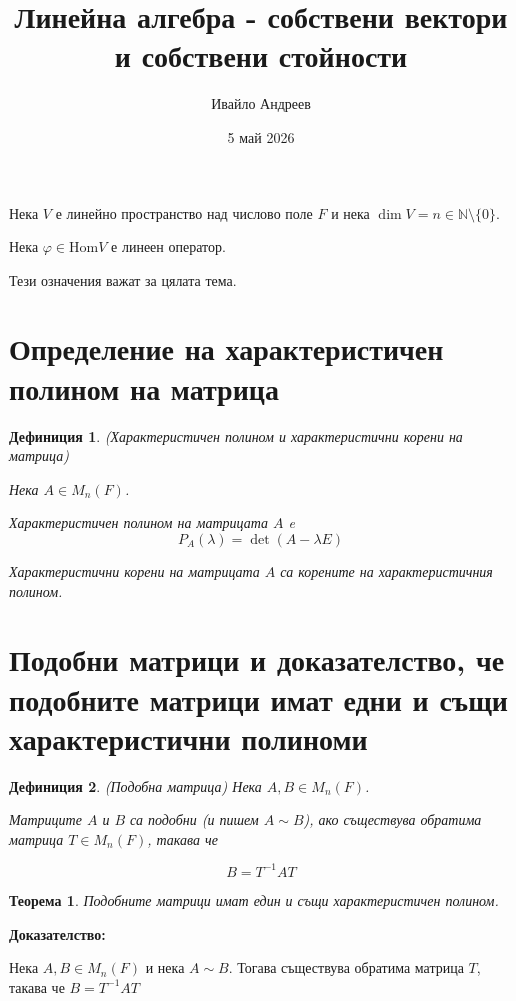 \documentclass{scrartcl}
\title{Линейна алгебра - собствени вектори и собствени стойности}
\author{Ивайло Андреев}
\date{5 май 2026}
\newtheorem{theorem}{Теорема}
\newtheorem{definition}{Дефиниция}
\begin{document}
\maketitle

\tableofcontents

\newpage

\begin{FlushLeft}

Нека $V$ е линейно пространство над числово поле $F$ и нека $\dim{V} = n \in \mathbb{N} \setminus \lbrace 0 \rbrace$.

Нека $\varphi \in \text{Hom}{V}$ е линеен оператор.

Тези означения важат за цялата тема.

\section{Определение на характеристичен полином на матрица}

\begin{definition}
(Характеристичен полином и характеристични корени на матрица)

Нека $A \in M_n(F)$.

Характеристичен полином на матрицата $A$ e
\[
P_A(\lambda) = \det(A - \lambda E)
\]

Характеристични корени на матрицата $A$ са корените на характеристичния полином.
\end{definition}

\section{Подобни матрици и
доказателство, че подобните матрици имат едни и същи характеристични полиноми}

\begin{definition}
(Подобна матрица)
Нека $A, B \in M_n(F)$.

Матриците $A$ и $B$ са подобни (и пишем $A \sim B$), ако съществува обратима матрица $T \in M_n(F)$, такава че

$$B = T^{-1}AT$$
\end{definition}

\begin{theorem}
Подобните матрици имат един и същи характеристичен полином.
\end{theorem}

\textbf{Доказателство:}

Нека $A, B \in M_n(F)$ и нека $A \sim B$. Тогава съществува обратима матрица $T$, такава че $B = T^{-1}AT$


\end{FlushLeft}
\end{document}
